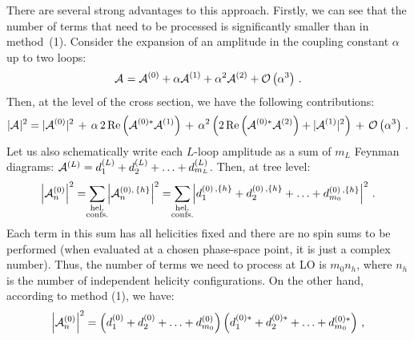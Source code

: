 \documentclass[main.tex]{subfiles}
\begin{document}
There are several strong advantages to this approach. Firstly, we can see that the number of terms that need to be processed is significantly smaller than in method~(1). Consider the expansion of an amplitude in the coupling constant $\alpha$ up to two loops:
\begin{equation}
    \mathcal{A}_{}^{} = \mathcal{A}_{}^{(0)} + \alpha \mathcal{A}_{}^{(1)} + \alpha^2 \mathcal{A}_{}^{(2)} + \mathcal{O}\left(\alpha^3\right) \,.
\end{equation}
Then, at the level of the cross section, we have the following contributions:
\begin{equation}
    |\mathcal{A}_{}^{}|^2 = |\mathcal{A}_{}^{(0)}|^2 \,+\,\alpha\,2\,\mathrm{Re}\left(\mathcal{A}_{}^{(0)\ast}\mathcal{A}_{}^{(1)}\right) \,+\, \alpha^2 \left(2\,\mathrm{Re} \left(\mathcal{A}_{}^{(0)\ast}\mathcal{A}_{}^{(2)}\right) + |\mathcal{A}_{}^{(1)}|^2 \right) \,+\, \mathcal{O}\left(\alpha^3\right)\,.
\end{equation}
Let us also schematically write each $L$-loop amplitude as a sum of $m_L$ Feynman diagrams: $\mathcal{A}_{}^{(L)} = d^{(L)}_1 + d^{(L)}_2 + \ldots + d^{(L)}_{m_L}$. Then, at tree level:
\begin{equation}
    \left|\ampl{n}{(0)}\right|^2 = \sum_{\mathclap{\substack{\text{hel.} \\ \text{confs.}}}} \left|\ampl{n}{(0),\,\{h\}} \right|^2 = \sum_{\mathclap{\substack{\text{hel.} \\ \text{confs.}}}} \left|d^{(0)\,,\{h\}}_1 + d^{(0)\,,\{h\}}_2 + \ldots + d^{(0)\,,\{h\}}_{m_0} \right|^2 \,.
\end{equation}
Each term in this sum has all helicities fixed and there are no spin sums to be performed (when evaluated at a chosen phase-space point, it is just a complex number). Thus, the number of terms we need to process at LO is $m_0 n_h$, where $n_h$ is the number of independent helicity configurations. On the other hand, according to method (1), we have:
\begin{equation}
    \left|\mathcal{A}_{n}^{(0)}\right|^2 = \left(d^{(0)}_1 + d^{(0)}_2 + \ldots + d^{(0)}_{m_0} \right) \left(d^{(0)\ast}_1 + d^{(0)\ast}_2 + \ldots + d^{(0)\ast}_{m_0} \right)\,,
\end{equation}
\end{document}
